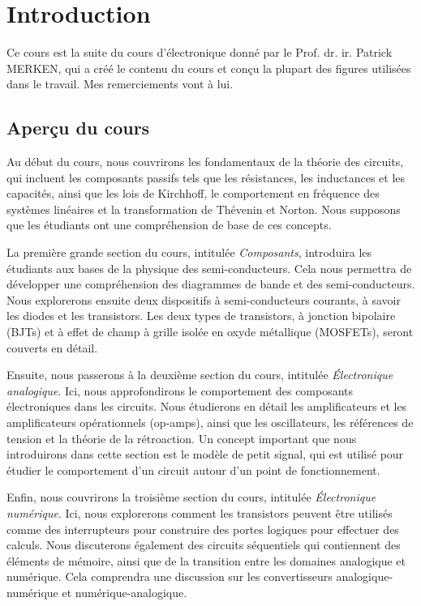 \chapter{Introduction}
\label{ch:introduction}
Ce cours est la suite du cours d'électronique donné par le Prof. dr. ir. Patrick MERKEN, qui a créé le contenu du cours et conçu la plupart des figures utilisées dans le travail. Mes remerciements vont à lui.\
\parindent=0pt

\section{Aperçu du cours}
Au début du cours, nous couvrirons les fondamentaux de la théorie des circuits, qui incluent les composants passifs tels que les résistances, les inductances et les capacités, ainsi que les lois de Kirchhoff, le comportement en fréquence des systèmes linéaires et la transformation de Thévenin et Norton. Nous supposons que les étudiants ont une compréhension de base de ces concepts.

La première grande section du cours, intitulée \emph{Composants}, introduira les étudiants aux bases de la physique des semi-conducteurs. Cela nous permettra de développer une compréhension des diagrammes de bande et des semi-conducteurs. Nous explorerons ensuite deux dispositifs à semi-conducteurs courants, à savoir les diodes et les transistors. Les deux types de transistors, à jonction bipolaire (BJTs) et à effet de champ à grille isolée en oxyde métallique (MOSFETs), seront couverts en détail.

Ensuite, nous passerons à la deuxième section du cours, intitulée \emph{Électronique analogique}. Ici, nous approfondirons le comportement des composants électroniques dans les circuits. Nous étudierons en détail les amplificateurs et les amplificateurs opérationnels (op-amps), ainsi que les oscillateurs, les références de tension et la théorie de la rétroaction. Un concept important que nous introduirons dans cette section est le modèle de petit signal, qui est utilisé pour étudier le comportement d'un circuit autour d'un point de fonctionnement.

Enfin, nous couvrirons la troisième section du cours, intitulée \emph{Électronique numérique}. Ici, nous explorerons comment les transistors peuvent être utilisés comme des interrupteurs pour construire des portes logiques pour effectuer des calculs. Nous discuterons également des circuits séquentiels qui contiennent des éléments de mémoire, ainsi que de la transition entre les domaines analogique et numérique. Cela comprendra une discussion sur les convertisseurs analogique-numérique et numérique-analogique.


